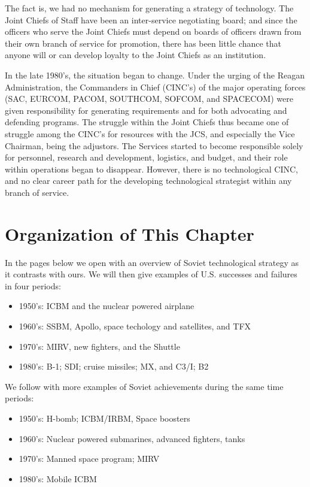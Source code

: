 \documentclass[a4paper,12pt]{book}
\begin{document}
The fact is, we had no mechanism for generating a strategy of technology. The Joint Chiefs of Staff have been an inter-service negotiating board; and since the officers who serve the Joint Chiefs must depend on boards of officers drawn from their own branch of service for promotion, there has been little chance that anyone will or can develop loyalty to the Joint Chiefs as an institution.

In the late 1980's, the situation began to change. Under the urging of the Reagan Administration, the Commanders in Chief (CINC's) of the major operating forces (SAC, EURCOM, PACOM, SOUTHCOM, SOFCOM, and SPACECOM) were given responsibility for generating requirements and for both advocating and defending programs. The struggle within the Joint Chiefs thus became one of struggle among the CINC's for resources with the JCS, and especially the Vice Chairman, being the adjustors. The Services started to become responsible solely for personnel, research and development, logistics, and budget, and their role within operations began to disappear. However, there is no technological CINC, and no clear career path for the developing technological strategist within any branch of service.

\section{Organization of This Chapter}
In the pages below we open with an overview of Soviet technological strategy as it contrasts with ours. We will then give examples of U.S. successes and failures in four periods:

\begin{itemize}
    \item 1950's: ICBM and the nuclear powered airplane
    \item 1960's: SSBM, Apollo, space techology and satellites, and TFX
    \item 1970's: MIRV, new fighters, and the Shuttle
    \item 1980's: B-1; SDI; cruise missiles; MX, and C3/I; B2
\end{itemize}

We follow with more examples of Soviet achievements during the same time periods:
\begin{itemize}
    \item 1950's: H-bomb; ICBM/IRBM, Space boosters
    \item 1960's: Nuclear powered submarines, advanced fighters, tanks
    \item 1970's: Manned space program; MIRV
    \item 1980's: Mobile ICBM
\end{itemize}
\end{document}
